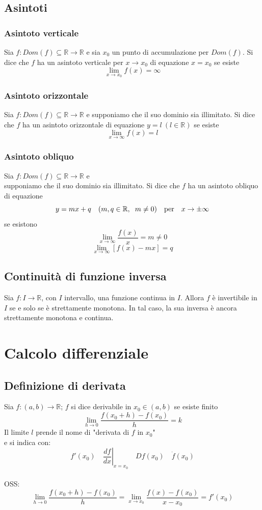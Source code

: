 \documentclass[12pt]{article}
\begin{document}
\subsection{Asintoti}
\subsubsection{Asintoto verticale}
Sia $f: Dom(f) \subseteq \mathbb{R} \to \mathbb{R}$ e sia
$x_0$ un punto di accumulazione per $Dom(f)$.
Si dice che $f$ ha un asintoto verticale
per $x \to x_0$ di equazione $x = x_0$
se esiste \[ \lim_{x \to x_0} f(x) = \infty\]

\subsubsection{Asintoto orizzontale}
Sia $f: Dom(f) \subseteq \mathbb{R} \to \mathbb{R}$ e
supponiamo che il suo dominio sia illimitato.
Si dice che $f$ ha un asintoto orizzontale
di equazione $y = l\ (l \in \mathbb{R})$
se esiste \[ \lim_{x \to \infty} f(x) = l\]
\subsubsection{Asintoto obliquo}
Sia $f: Dom(f) \subseteq \mathbb{R} \to \mathbb{R}$ e\\
supponiamo che il suo dominio sia illimitato.
Si dice che $f$ ha un asintoto obliquo
di equazione
\[ y = mx+q \quad (m, q \in \mathbb{R}, \hspace*{0.2cm} m \neq 0)\quad \text{per} \quad  x \to \pm \infty \]
se esistono
\[ \lim_{x \to \infty} \frac{f(x)}{x} = m \neq 0 \]
\[ \lim_{x \to \infty} [f(x) - mx] = q \]

\subsection{Continuità di funzione inversa}
Sia $f: I \to \mathbb{R}$, con $I$ intervallo,
una funzione continua in $I$. Allora $f$ è invertibile
in $I$ se e solo se è strettamente monotona.
In tal caso, la sua inversa è ancora strettamente
monotona e continua.

\section{Calcolo differenziale}

\subsection{Definizione di derivata}
Sia $f: (a,b) \to \mathbb{R}$; $f$ si dice
derivabile in $x_0 \in (a,b)$ se esiste finito
\[ \lim_{h \to 0} \frac{f(x_0 +h) - f(x_0)}{h}=k\]
Il limite $l$ prende il nome di "derivata di $f$ in $x_0$"\\
e si indica con:
\[ f'(x_0) \quad \left. \frac{df}{dx} \right |_{x = x_0} \quad  Df(x_0) \quad \dot{f}(x_0) \]
\\
OSS:
\[ \lim_{h \to 0} \frac{f(x_0 +h) - f(x_0)}{h} = \lim_{x \to x_0} \frac{f(x) - f(x_0)}{x - x_0} = f'(x_0)\]
\end{document}
